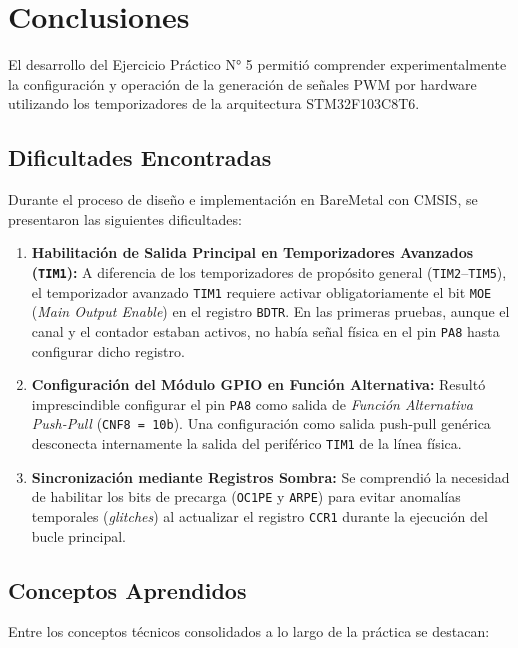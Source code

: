 \chapter{Conclusiones}
\label{ch.ej5:conclusiones}

El desarrollo del Ejercicio Práctico N° 5 permitió comprender experimentalmente la configuración y operación de la
generación de señales PWM por hardware utilizando los temporizadores de la arquitectura STM32F103C8T6.

\section{Dificultades Encontradas}
Durante el proceso de diseño e implementación en BareMetal con CMSIS, se presentaron las siguientes dificultades:

\begin{enumerate}
    \item \textbf{Habilitación de Salida Principal en Temporizadores Avanzados (\texttt{TIM1}):} A diferencia de los
    temporizadores de propósito general (\texttt{TIM2}--\texttt{TIM5}), el temporizador avanzado \texttt{TIM1} requiere
    activar obligatoriamente el bit \lstinline{MOE} (\textit{Main Output Enable}) en el registro \lstinline{BDTR}. En las
    primeras pruebas, aunque el canal y el contador estaban activos, no había señal física en el pin \texttt{PA8}
    hasta configurar dicho registro.
    \item \textbf{Configuración del Módulo GPIO en Función Alternativa:} Resultó imprescindible configurar el pin
    \texttt{PA8} como salida de \textit{Función Alternativa Push-Pull} (\lstinline{CNF8 = 10b}). Una configuración
    como salida push-pull genérica desconecta internamente la salida del periférico \texttt{TIM1} de la línea física.
    \item \textbf{Sincronización mediante Registros Sombra:} Se comprendió la necesidad de habilitar los bits de
    precarga (\lstinline{OC1PE} y \lstinline{ARPE}) para evitar anomalías temporales (\textit{glitches}) al actualizar
    el registro \lstinline{CCR1} durante la ejecución del bucle principal.
\end{enumerate}

\section{Conceptos Aprendidos}
Entre los conceptos técnicos consolidados a lo largo de la práctica se destacan:

